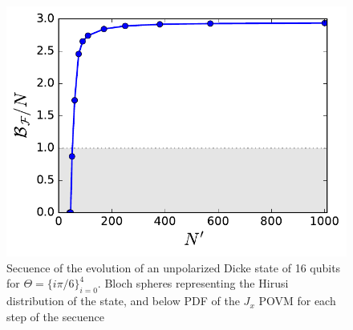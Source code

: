 \begin{figure}
  \centering
  \includegraphics[scale=.65]{img/plots/LT_dicke_7900_asymp.pdf}
  \caption{Secuence of the evolution of an unpolarized Dicke state of 16 qubits for $\Theta=\{i\pi/6\}_{i=0}^4$. Bloch spheres representing the Hirusi distribution of the state, and below PDF of the $J_x$ POVM for each step of the secuence}
  \label{fig:vd-secuence-evo}
\end{figure}
